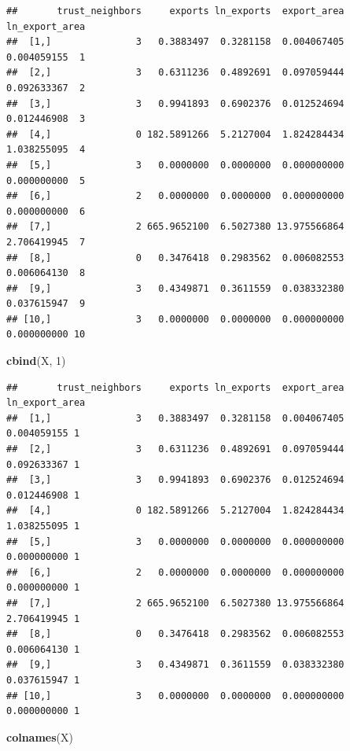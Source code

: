 \documentclass[
]{book}
\newenvironment{Shaded}{\begin{snugshade}}{\end{snugshade}}
\newcommand{\DecValTok}[1]{\textcolor[rgb]{0.00,0.00,0.81}{#1}}
\newcommand{\KeywordTok}[1]{\textcolor[rgb]{0.13,0.29,0.53}{\textbf{#1}}}
\newcommand{\NormalTok}[1]{#1}
\theoremstyle{definition}
\theoremstyle{definition}
\theoremstyle{definition}
\theoremstyle{definition}
\theoremstyle{remark}
\begin{document}
\begin{verbatim}
##       trust_neighbors     exports ln_exports  export_area ln_export_area   
##  [1,]               3   0.3883497  0.3281158  0.004067405    0.004059155  1
##  [2,]               3   0.6311236  0.4892691  0.097059444    0.092633367  2
##  [3,]               3   0.9941893  0.6902376  0.012524694    0.012446908  3
##  [4,]               0 182.5891266  5.2127004  1.824284434    1.038255095  4
##  [5,]               3   0.0000000  0.0000000  0.000000000    0.000000000  5
##  [6,]               2   0.0000000  0.0000000  0.000000000    0.000000000  6
##  [7,]               2 665.9652100  6.5027380 13.975566864    2.706419945  7
##  [8,]               0   0.3476418  0.2983562  0.006082553    0.006064130  8
##  [9,]               3   0.4349871  0.3611559  0.038332380    0.037615947  9
## [10,]               3   0.0000000  0.0000000  0.000000000    0.000000000 10
\end{verbatim}

\begin{Shaded}
\begin{Highlighting}[]
\KeywordTok{cbind}\NormalTok{(X, }\DecValTok{1}\NormalTok{)}
\end{Highlighting}
\end{Shaded}

\begin{verbatim}
##       trust_neighbors     exports ln_exports  export_area ln_export_area  
##  [1,]               3   0.3883497  0.3281158  0.004067405    0.004059155 1
##  [2,]               3   0.6311236  0.4892691  0.097059444    0.092633367 1
##  [3,]               3   0.9941893  0.6902376  0.012524694    0.012446908 1
##  [4,]               0 182.5891266  5.2127004  1.824284434    1.038255095 1
##  [5,]               3   0.0000000  0.0000000  0.000000000    0.000000000 1
##  [6,]               2   0.0000000  0.0000000  0.000000000    0.000000000 1
##  [7,]               2 665.9652100  6.5027380 13.975566864    2.706419945 1
##  [8,]               0   0.3476418  0.2983562  0.006082553    0.006064130 1
##  [9,]               3   0.4349871  0.3611559  0.038332380    0.037615947 1
## [10,]               3   0.0000000  0.0000000  0.000000000    0.000000000 1
\end{verbatim}

\begin{Shaded}
\begin{Highlighting}[]
\KeywordTok{colnames}\NormalTok{(X)}
\end{Highlighting}
\end{Shaded}
\end{document}
